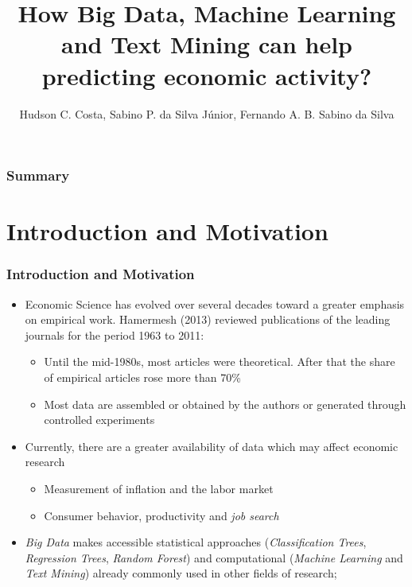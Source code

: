 \documentclass[aspectratio=169]{beamer}
\title[\sc{}]{How Big Data, Machine Learning and Text Mining can help predicting economic activity?}
\author{Hudson C. Costa, Sabino P. da Silva Júnior, Fernando A. B. Sabino da Silva}
\institute{Appus/HR Analytics, PPGE/UFRGS, Department of Statistics/UFRGS}
\date{}
\begin{document}



\begin{frame}
  \titlepage
\end{frame}

\begin{frame}[plain]\frametitle{Summary}
\small\tableofcontents
\end{frame}

\section{Introduction and Motivation}

\begin{frame}\frametitle{Introduction and Motivation}
  \begin{itemize}
  \item Economic Science has evolved over several decades toward a greater emphasis on empirical work. Hamermesh (2013) reviewed publications of the leading journals for the period 1963 to 2011:
    \begin{itemize}
      \item Until the mid-1980s, most articles were theoretical. After that the share of empirical articles rose more than 70\% 
      \item Most data are assembled or obtained by the authors or generated through controlled experiments 
    \end{itemize}
  \item Currently, there are a greater availability of data which may affect economic research
    \begin{itemize}
      \item Measurement of inflation and the labor market
       \item  Consumer behavior, productivity and \emph{job search}
    \end{itemize}
  \item \emph{Big Data} makes accessible statistical approaches (\emph{Classification Trees}, \emph{Regression Trees}, \emph{Random Forest}) and computational (\emph{Machine Learning} and \emph{Text Mining}) already commonly used in other fields of research;
  \end{itemize}
\end{frame}
\end{document}
